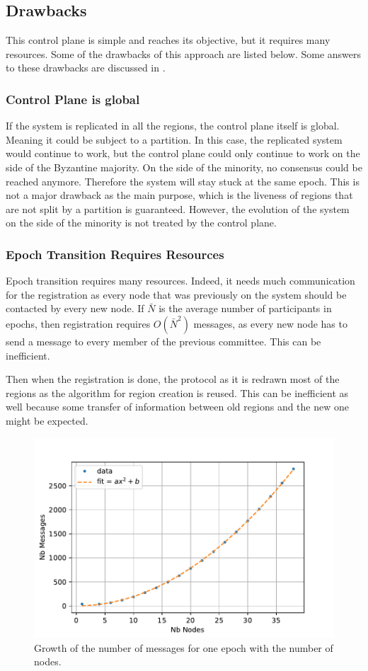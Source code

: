 \documentclass[a4paper,11pt,twoside=semi,openright]{report}
\begin{document}
\subsection{Drawbacks}
This control plane is simple and reaches its objective, but it requires many
resources. Some of the drawbacks of this approach are listed below. 
Some answers to these drawbacks are discussed in .  

\subsubsection{Control Plane is global}
If the system is replicated in all the regions, the control plane itself is
global. Meaning it could be subject to a partition. In this case, the replicated
system would continue to work, but the control plane could only continue to
work on the side of the Byzantine majority.  On the side of the minority, no
consensus could be reached anymore. Therefore the system will stay stuck at the
same epoch. This is not a major drawback as the main purpose, which is the
liveness of regions that are not split by a partition is guaranteed. However,
the evolution of the system on the side of the minority is not treated by the
control plane.

\subsubsection{Epoch Transition Requires Resources}
Epoch transition requires many resources. Indeed, it needs much
communication for the registration as every node that was
previously on the system should be contacted by every new node. If $\bar{N}$ is
the average number of participants in epochs, then registration requires
$O(\bar{N}^2)$ messages, as every new node has to send a message to every
member of the previous committee. This can be inefficient. 

Then when the registration is done, the protocol as it is redrawn most of
the regions as the algorithm for region creation is reused. This can be
inefficient as well because some transfer of information between old regions
and the new one might be expected.

\begin{figure}[!h] 
\centering
\includegraphics[width=350pt]{figures/messages-plot}
\caption{Growth of the number of messages for one epoch with the number of nodes.}
\label{fig:messages-plot}
\end{figure}
\end{document}
